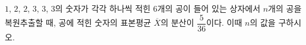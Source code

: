 $1$, $2$, $2$, $3$, $3$, $3$의 숫자가 각각 하나씩 적힌 $6$개의 공이 들어 있는 상자에서 $n$개의 공을 복원추출할 때, 공에 적힌 숫자의 표본평균 $\overline{X}$의 분산이 $\dfrac{5}{36}$이다. 이때 $n$의 값을 구하시오.
